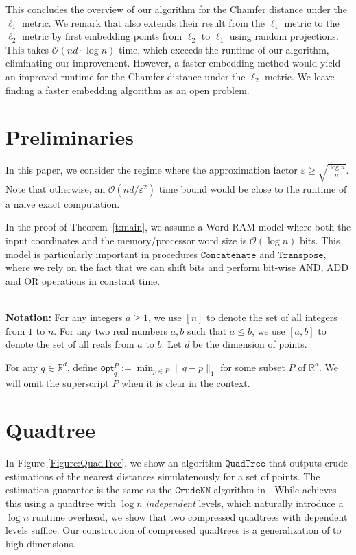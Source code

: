 \documentclass[11pt]{article}
\newcommand{\eps}{\varepsilon}
\theoremstyle{plain}
\newcommand{\OO}{\mathcal{O}}
\newcommand{\R}{\mathbb{R}}
\newcommand{\opt}{\mathsf{opt}}
\newcommand{\QuadTree}{\texttt{QuadTree}} \usepackage{microtype}
\begin{document}
This concludes the overview of our algorithm for the Chamfer distance under the $\ell_1$ metric. We remark that \cite{BIJ24} also extends their result from the $\ell_1$ metric to the $\ell_2$ metric by first embedding points from $\ell_2$ to $\ell_1$ using random projections. This takes $\OO(nd \cdot \log n)$ time, which exceeds the runtime of our algorithm, eliminating our improvement. However, a faster embedding method would yield an improved runtime for the Chamfer distance under the $\ell_2$ metric. We leave finding a faster embedding algorithm as an open problem.


 \section{Preliminaries}

In this paper, we consider the regime where the approximation factor $\eps \geq \sqrt{\frac{\log n}{n}}$. Note that otherwise, an $\OO(nd/\eps^2)$ time bound would be close to the runtime of a naive exact computation.

In the proof of Theorem~\ref{t:main}, we assume a Word RAM model where both the input coordinates and the memory/processor word size is $\OO(\log n)$ bits.
This model is particularly important in procedures $\texttt{Concatenate}$ and $\texttt{Transpose}$, where we rely on the fact that we can shift bits and perform bit-wise AND, ADD and OR operations in constant time. 


\ \\
{\bf Notation:} For any integers $a \geq 1$, we use $[n]$ to denote the set of all integers from $1$ to $n$. For any two real numbers $a, b$ such that $a \leq b$, we use $[a, b]$ to denote the set of all reals from $a$ to $b$. Let $d$ be the dimension of points. 

For any $q \in \R^d$, define $\opt^P_q := \min_{p \in P}\lVert q-p\rVert_1$ for some subset $P$ of $\R^d$. We will omit the superscript $P$ when it is clear in the context.  \section{Quadtree}


In Figure \ref{Figure:QuadTree}, we show an algorithm $\QuadTree$ that outputs crude estimations of the nearest distances simulatenously for a set of points. The estimation guarantee is the same as the $\mathtt{CrudeNN}$ algorithm in \cite{BIJ24}. While \cite{BIJ24} achieves this using a quadtree with $\log n$ {\it independent} levels, which naturally introduce a $\log n$ runtime overhead, we show that two compressed quadtrees with dependent levels suffice. Our construction of compressed quadtrees is a generalization of \cite{C08} to high dimensions.
\end{document}

